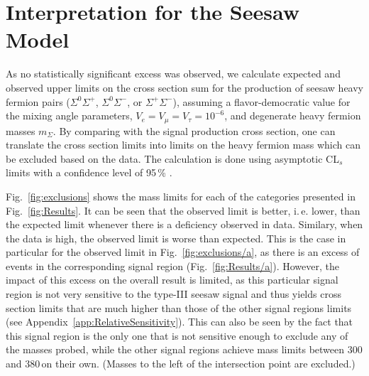 \section{Interpretation for the Seesaw Model}
\label{sec:Interpretation}
\label{sec:Interpretation/Seesaw}

As no statistically significant excess was observed, we calculate expected and observed upper limits on the cross section sum for the production of seesaw heavy fermion pairs ($\Sigma^0\Sigma^+$, $\Sigma^0\Sigma^-$, or $\Sigma^+\Sigma^-$), assuming a flavor-democratic value for the mixing angle parameters, $V_e = V_\mu = V_\tau = 10^{-6}$, and degenerate heavy fermion masses $m_\Sigma$.
By comparing with the signal production cross section, one can translate the cross section limits into limits on the heavy fermion mass which can be excluded based on the data.
The calculation is done using asymptotic CL$_s$ limits with a confidence level of 95\,\% \cite{Junk:1999kv,Read:2000ru,Read:2002hq}.

Fig.~\ref{fig:exclusions} shows the mass limits for each of the categories presented in Fig.~\ref{fig:Results}. It can be seen that the observed limit is better, i.\,e. lower, than the expected limit whenever there is a deficiency observed in data. Similary, when the data is high, the observed limit is worse than expected. This is the case in particular for the observed limit in Fig.~\ref{fig:exclusions/a}, as there is an excess of events in the corresponding signal region (Fig.~\ref{fig:Results/a}). However, the impact of this excess on the overall result is limited, as this particular signal region is not very sensitive to the type-III seesaw signal and thus yields cross section limits that are much higher than those of the other signal regions limits (see Appendix~\ref{app:RelativeSensitivity}). This can also be seen by the fact that this signal region is the only one that is not sensitive enough to exclude any of the masses probed, while the other signal regions achieve mass limits between 300 and 380\,\GeV on their own. (Masses to the left of the intersection point are excluded.)

